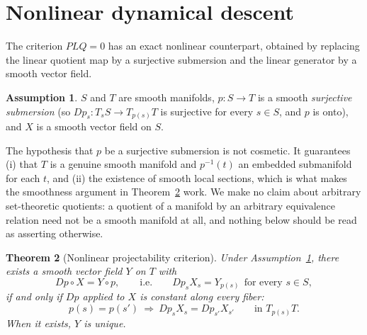 \documentclass[11pt,reqno]{amsart}
\numberwithin{equation}{section}
\theoremstyle{plain}
\newtheorem{theorem}{Theorem}[section]
\theoremstyle{definition}
\newtheorem{assumption}[theorem]{Assumption}
\theoremstyle{remark}
\begin{document}
\section{Nonlinear dynamical descent}
\label{sec:nonlinear}

The criterion $PLQ=0$ has an exact nonlinear counterpart, obtained by replacing the linear
quotient map by a surjective submersion and the linear generator by a smooth vector field.

\begin{assumption}
\label{ass:submersion}
$S$ and $T$ are smooth manifolds, $p:S\to T$ is a smooth \emph{surjective submersion} (so
$Dp_{s}:T_{s}S\to T_{p(s)}T$ is surjective for every $s\in S$, and $p$ is onto), and $X$ is a
smooth vector field on $S$.
\end{assumption}

The hypothesis that $p$ be a surjective submersion is not cosmetic. It guarantees (i) that
$T$ is a genuine smooth manifold and $p^{-1}(t)$ an embedded submanifold for each $t$, and
(ii) the existence of smooth local sections, which is what makes the smoothness argument in
Theorem~\ref{thm:projectable} work. We make no claim about arbitrary set-theoretic quotients:
a quotient of a manifold by an arbitrary equivalence relation need not be a smooth manifold
at all, and nothing below should be read as asserting otherwise.

\begin{theorem}[Nonlinear projectability criterion]
\label{thm:projectable}
Under Assumption~\ref{ass:submersion}, there exists a smooth vector field $Y$ on $T$ with
\begin{equation}
\label{eq:prel}
Dp\circ X=Y\circ p ,
\qquad\text{i.e.}\qquad
Dp_{s}X_{s}=Y_{p(s)}\ \ \text{for every }s\in S,
\end{equation}
if and only if $Dp$ applied to $X$ is constant along every fiber:
\begin{equation}
\label{eq:fiberconst}
p(s)=p(s')\ \Longrightarrow\ Dp_{s}X_{s}=Dp_{s'}X_{s'}
\qquad\text{in }T_{p(s)}T .
\end{equation}
When it exists, $Y$ is unique.
\end{theorem}
\end{document}
